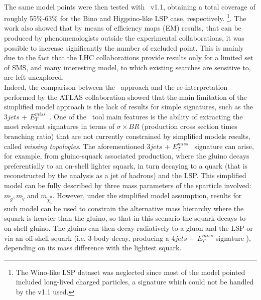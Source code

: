\documentclass[epj,nopacs,fleqn]{svjour}
\newcommand{\MET}{{ $E_T ^{miss}$}}
\begin{document}
%
\\
The same model points were then tested with \SMO~v1.1\cite{Ambrogi:2017neo}, obtaining a total coverage of roughly 55$\%$-63$\%$ for the Bino and Higgsino-like LSP case, respectively. \footnote{The Wino-like LSP dataset was neglected since most of the model pointed included long-lived charged particles, a signature which could not be handled by the v1.1 used.}. The work also showed that by means of efficiency maps (EM) results, that can be produced by phenomenologists outside the experimental collaborations, it was possible to increase significantly the number of excluded point. This is mainly due to the fact that the LHC collaborations provide results only for a limited set of SMS, and many interesting model, to which existing searches are sensitive to, are left unexplored.
\\
Indeed, the comparison between the \SMO~approach and the re-interpretation performed by the ATLAS collaboration showed  that the main limitation of the simplified model approach is the lack of results for simple signatures, such as the $3jets$ +\MET~. One of the \SMO~tool main features is the ability of extracting the most relevant signatures in terms of $\sigma \times BR$ (production cross section  times branching ratio) that are not currently constrained by simplified models results, called \textit{missing topologies}. The aforementioned $3jets$ +\MET~ signature can arise, for example, from gluino-squark associated production, where the gluino decays preferentially to an on-shell lighter squark, in turn decaying to a quark (that is reconstructed by the analysis as a jet of hadrons) and the LSP. This simplified model can be fully described by three mass parameters of the sparticle involved: $m_{\tilde g}, m_{\tilde q}$ and $m_{\tilde \chi _1 ^0}$. However, under the simplified model assumption, results for such model can be used to constrain the alternative mass hierarchy where the squark is heavier than the gluino, so that in this scenario the squark decays to on-shell gluino. The gluino can then decay radiatively to a gluon and the LSP or via an off-shell squark (i.e. 3-body decay, producing a $4jets$ + $E_T ^{miss}$ signature ), depending on its mass difference with the lightest squark. 
\end{document}
